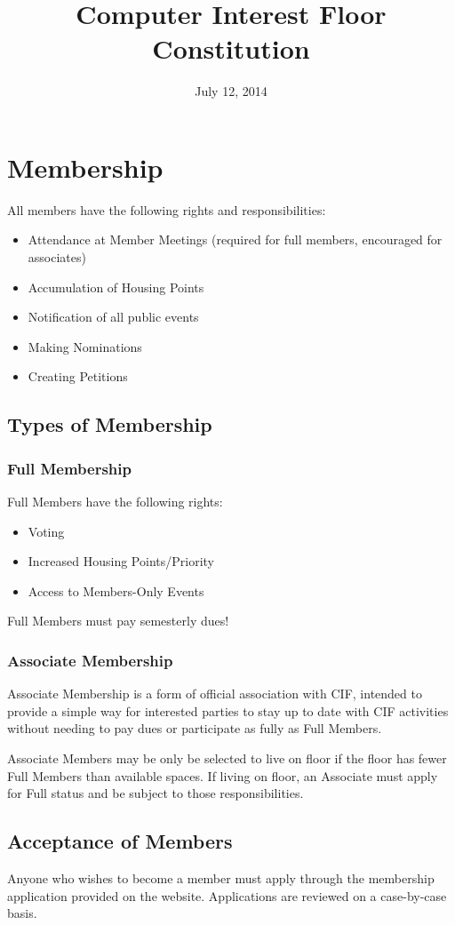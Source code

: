 \documentclass[12pt]{amsart}
\title{Computer Interest Floor Constitution}
\date{July 12, 2014}
\begin{document}
\maketitle

\section{Membership}
All members have the following rights and responsibilities:
\begin{itemize}
	\item Attendance at Member Meetings (required for full members, encouraged for associates)
	\item Accumulation of Housing Points
	\item Notification of all public events
	\item Making Nominations
	\item Creating Petitions
\end{itemize}
	\subsection{Types of Membership}
		\subsubsection {Full Membership}
		Full Members have the following rights:
		\begin{itemize}
			\item Voting
			\item Increased Housing Points/Priority
			\item Access to Members-Only Events
		\end{itemize}
		Full Members must pay semesterly dues!
		
		\subsubsection {Associate Membership}
		Associate Membership is a form of official association with CIF, intended to provide a simple way for interested parties to stay up to date with CIF activities without needing to pay dues or participate as fully as Full Members.

Associate Members may be only be selected to live on floor if the floor has fewer Full Members than available spaces. If living on floor, an Associate must apply for Full status and be subject to those responsibilities.
	\subsection {Acceptance of Members}
	Anyone who wishes to become a member must apply through the membership application provided on the website. Applications are reviewed on a case-by-case basis. 
	
\end{document}
